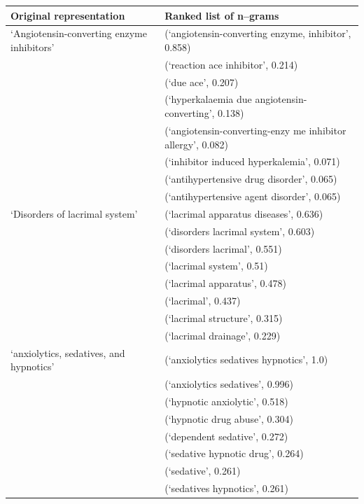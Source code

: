 \documentclass{sig-alternate-05-2015}
\begin{document}
\begin{table}
\begin{center}
\begin{tabular}{l l}
\toprule
Original representation &  Ranked list of n--grams \\
\toprule
`Angiotensin-converting enzyme inhibitors' & (`angiotensin-converting enzyme, inhibitor', 0.858)\\
								 	& (`reaction ace inhibitor', 0.214)\\ 
									& (`due ace', 0.207)\\
									& (`hyperkalaemia due angiotensin-converting', 0.138)\\
									& (`angiotensin-converting-enzy me inhibitor allergy', 0.082)\\
									& (`inhibitor induced hyperkalemia', 0.071) \\
									& (`antihypertensive drug disorder', 0.065) \\
									& (`antihypertensive agent disorder', 0.065) \\
\hline
`Disorders of lacrimal system' & (`lacrimal apparatus diseases', 0.636)\\
						& (`disorders lacrimal system', 0.603)\\
						& (`disorders lacrimal', 0.551)\\
						& (`lacrimal system', 0.51)\\
						& (`lacrimal apparatus', 0.478)\\
						& (`lacrimal', 0.437)\\
						&(`lacrimal structure', 0.315)\\
						& (`lacrimal drainage', 0.229) \\
\hline
`anxiolytics, sedatives, and hypnotics' & (`anxiolytics sedatives hypnotics', 1.0)\\
								& (`anxiolytics sedatives', 0.996)\\
								& (`hypnotic anxiolytic', 0.518)\\
								&(`hypnotic drug abuse', 0.304)\\
								 &(`dependent sedative', 0.272)\\
								 & (`sedative hypnotic drug', 0.264)\\
								 & (`sedative', 0.261)\\
								 & (`sedatives hypnotics', 0.261) \\


\end{tabular}
\end{center}
\end{table}
\end{document}
